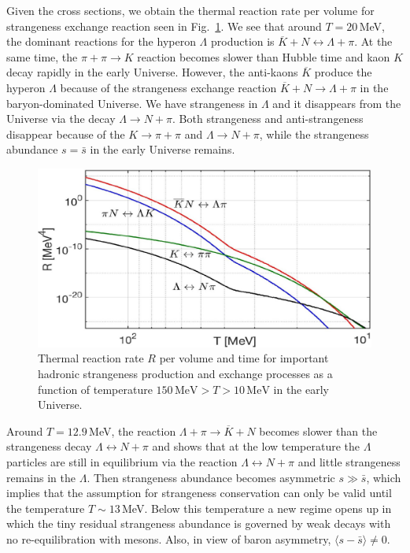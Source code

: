 Given the cross sections, we obtain the thermal reaction rate per volume for strangeness exchange reaction seen in Fig.~\ref{Lambda_Rate_volume.fig}. We see that around $T=20$\,MeV, the dominant reactions for the hyperon $\Lambda$ production is $\overline{K}+N\leftrightarrow\Lambda+\pi$. At the same time, the $\pi+\pi\to K$ reaction becomes slower than Hubble time and kaon $K$ decay rapidly in the early Universe. However, the anti-kaons $\overline K$ produce the hyperon $\Lambda$ because of the strangeness exchange reaction $\overline{K}+N\rightarrow\Lambda+\pi$ in the baryon-dominated Universe. We have strangeness in $\Lambda$ and it disappears from the Universe via the decay $\Lambda\rightarrow N+\pi$. Both strangeness and anti-strangeness disappear because of the $K\rightarrow\pi+\pi$ and $\Lambda\rightarrow N+\pi$, while the strangeness abundance $s = \bar{s}$ in the early Universe remains.

\begin{figure}[ht]
\centering
\includegraphics[width=0.9\linewidth]{./plots/NewHyperonRate_C.jpg}
\caption{Thermal reaction rate $R$ per volume and time for important hadronic strangeness production and exchange processes as a function of temperature $150\,\mathrm{MeV}> T>10\,\mathrm{MeV}$ in the early Universe.}
\label{Lambda_Rate_volume.fig}
\end{figure}

Around $T=12.9$\,MeV, the reaction $\Lambda+\pi\rightarrow\overline{K}+N$ becomes slower than the strangeness decay $\Lambda\leftrightarrow N+\pi$ and shows that at the low temperature the $\Lambda$ particles are still in equilibrium via the reaction $\Lambda\leftrightarrow N+\pi$ and little strangeness remains in the $\Lambda$. Then strangeness abundance becomes asymmetric $s\gg \bar{s}$, which implies that the assumption for strangeness conservation can only be valid until the temperature $T\sim13$\,MeV. Below this temperature a new regime opens up in which the tiny residual strangeness abundance is governed by weak decays with no re-equilibration with mesons. Also, in view of baron asymmetry, $\langle s-\bar s\rangle \ne 0$.

